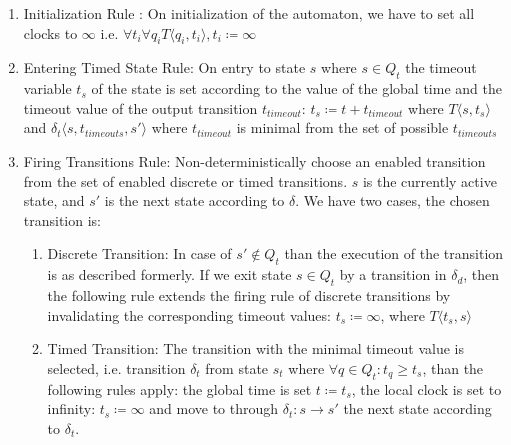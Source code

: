 				\begin{enumerate}
					\item Initialization Rule : On initialization of the automaton, we have to set all clocks to $\infty$ 
					i.e. $\forall t_i \forall q_i T \langle q_i, t_i \rangle, t_i \coloneqq \infty $
					
					\item Entering Timed State Rule: On entry to state $s$ where $s \in Q_t$ the timeout variable $t_s$ of the state is set according to the value of the global time and the timeout value of the output transition $t_{timeout}$:
						$t_s\coloneqq t+t_{timeout}$
						where $T\langle s,t_s \rangle$ and $\delta_t\langle s,t_{timeouts},s' \rangle$ where $t_{timeout}$ is minimal from the set of possible $t_{timeouts}$ 
					
					\item Firing Transitions Rule: Non-deterministically choose an enabled transition from the set of enabled discrete or timed transitions. 
						$s$ is the currently active state, and $s'$ is the next state according to $\delta$.
						We have two cases, the chosen transition is:
						\begin{enumerate}
							\item Discrete Transition: In case of $s' \notin Q_t$ than the execution of the transition is as described formerly. 
							If we exit state $s \in Q_t$ by a transition in $\delta_d$, 
							then the following rule extends the firing rule of discrete transitions by invalidating the corresponding timeout values:
								$t_s \coloneqq \infty$, where $T \langle t_s, s \rangle$
							\item Timed Transition: The transition with the minimal timeout value is selected, 
								i.e. transition $\delta_t$ from state $s_t$ where $\forall q \in Q_t: t_q \geq t_s$, than the following rules apply:
								the global time is set $t \coloneqq t_s$, the local clock is set to infinity: 
								$t_s \coloneqq \infty$ and move to through $\delta_t : s \rightarrow s'$ the next state according to $\delta_t$.
						\end{enumerate}			
				\end{enumerate}
				
				
			
